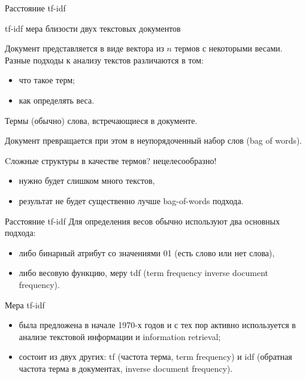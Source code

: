 \begin{frame}{Расстояние tf-idf}
\begin{block}{tf-idf}
мера близости двух текстовых документов
\end{block}
Документ представляется в виде вектора из $n$ термов с некоторыми весами. Разные подходы к анализу текстов различаются в том:  
\begin{itemize}
\item что такое терм;
\item как определять веса.
\end{itemize}
\begin{block}{Термы}
(обычно) слова, встречающиеся в документе. 
\end{block}
Документ превращается при этом в неупорядоченный набор слов (bag of words).

Cложные структуры в качестве термов? нецелесообразно!
\begin{itemize}
\item нужно будет слишком много текстов, 
\item результат не будет существенно лучше bag-of-words подхода.
\end{itemize}  
\end{frame}

\begin{frame}{Расстояние tf-idf}
Для определения весов обычно используют два основных подхода:
\begin{itemize}
\item либо бинарный атрибут со значениями 01 (есть слово или нет слова),
\item либо весовую функцию, меру tdf (term frequency  inverse document frequency).
\end{itemize}  

\begin{block}{Мера tf-idf}
\begin{itemize}
\item была предложена в начале 1970-х годов и с тех пор активно используется в анализе текстовой информации и information retrieval;
\item состоит из двух других: tf (частота терма, term frequency) и idf (обратная частота
терма в документах, inverse document frequency).
\end{itemize}
\end{block}
\end{frame}

